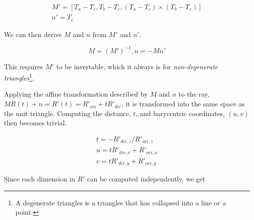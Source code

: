 \begin{displaymath}
  \begin{array}{l}
    M' = \left[ T_a - T_c, T_b - T_c, (T_a - T_c) \times (T_b - T_c)
      \right]\\
    n' = T_c
  \end{array}
\end{displaymath}

We can then derive $M$ and $n$ from $M'$ and $n'$. 

\begin{displaymath}
  M = (M')^{-1},
  n = - M n'
\end{displaymath}

This requires $M'$ to be invertable, which it always is for
\textit{non-degenerate triangles}\footnote{A degenerate triangles is
  a triangles that has collapsed into a line or a point.}.



Applying the affine transformation described by $M$ and $n$ to the ray, $M R(t)
+ n = R'(t) = R'_{ori} + tR'_{dir}$, it is transformed into the same space as
the unit triangle. Computing the distance, $t$, and barycentric coordinates,
$(u,v)$ then becomes trivial.

\begin{displaymath}
  \begin{array}{l}
    t = - R'_{dir,z} / R'_{ori,z} \\
    u = t R'_{dir,x} + R'_{ori,x} \\
    v = t R'_{dir,y} + R'_{ori,y}
  \end{array}
\end{displaymath}

Since each dimension in $R'$ can be computed independently, we get 

